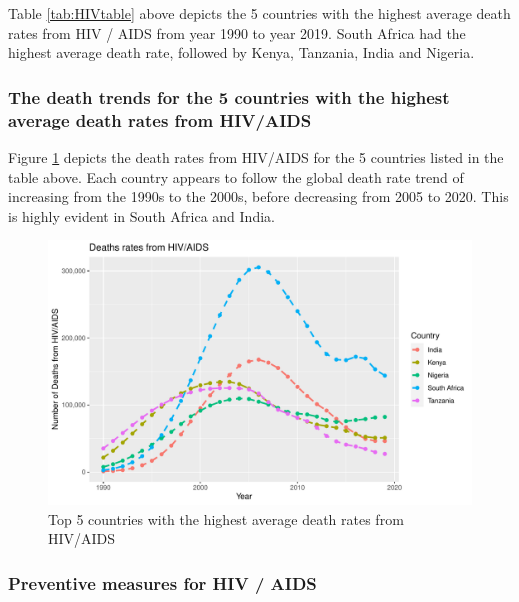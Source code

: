 \documentclass[11pt,a4paper,]{article}
\begin{document}
Table \ref{tab:HIVtable} above depicts the 5 countries with the highest average death rates from HIV / AIDS from year 1990 to year 2019. South Africa had the highest average death rate, followed by Kenya, Tanzania, India and Nigeria.

\hypertarget{the-death-trends-for-the-5-countries-with-the-highest-average-death-rates-from-hivaids}{%
\subsubsection{The death trends for the 5 countries with the highest average death rates from HIV/AIDS}\label{the-death-trends-for-the-5-countries-with-the-highest-average-death-rates-from-hivaids}}

Figure \ref{fig:HIVtrend} depicts the death rates from HIV/AIDS for the 5 countries listed in the table above. Each country appears to follow the global death rate trend of increasing from the 1990s to the 2000s, before decreasing from 2005 to 2020. This is highly evident in South Africa and India.

\begin{figure}
\centering
\includegraphics{report_files/figure-latex/HIVtrend-1.pdf}
\caption{\label{fig:HIVtrend}Top 5 countries with the highest average death rates from HIV/AIDS}
\end{figure}

\clearpage

\hypertarget{preventive-measures-for-hiv-aids}{%
\subsubsection{\texorpdfstring{Preventive measures for \textbf{HIV / AIDS}}{Preventive measures for HIV / AIDS}}\label{preventive-measures-for-hiv-aids}}
\end{document}

